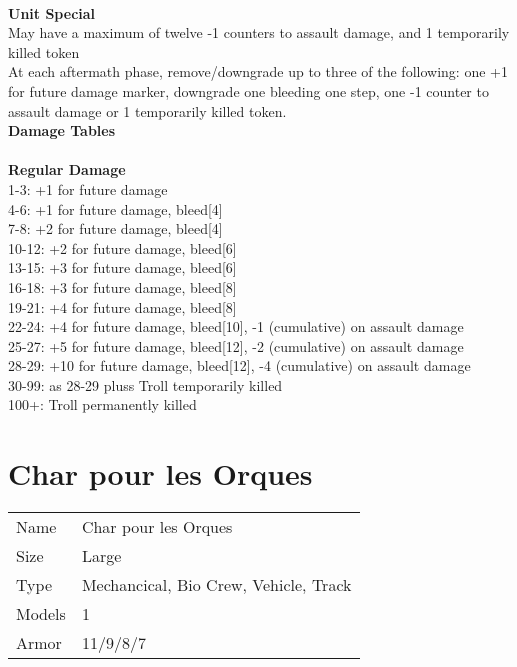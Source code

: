 \ \\



{\bf Unit Special} \\
May have a maximum of twelve -1 counters to assault damage, and 1 temporarily killed token\\ At each aftermath phase, remove/downgrade up to three of the following: one +1 for future damage marker, downgrade one bleeding one step, one -1 counter to assault damage or 1 temporarily killed token.\\

{\bf Damage Tables} \\
\ \\ {\bf Regular Damage } \\
1-3: +1 for future damage \\
4-6: +1 for future damage, bleed[4] \\
7-8: +2 for future damage, bleed[4] \\
10-12: +2 for future damage, bleed[6] \\
13-15: +3 for future damage, bleed[6] \\
16-18: +3 for future damage, bleed[8] \\
19-21: +4 for future damage, bleed[8] \\
22-24: +4 for future damage, bleed[10], -1 (cumulative) on assault damage \\
25-27: +5 for future damage, bleed[12], -2 (cumulative) on assault damage \\
28-29: +10 for future damage, bleed[12], -4 (cumulative) on assault damage \\
30-99: as 28-29 pluss Troll temporarily killed \\
100+: Troll permanently killed \\










\pagebreak

\section{ Char pour les Orques }

\begin{tabular}{ll}
  Name & Char pour les Orques \\
  Size & Large\\
  Type & Mechancical, Bio Crew, Vehicle, Track\\
  Models & 1\\
  Armor & 11/9/8/7\\
\end{tabular}



